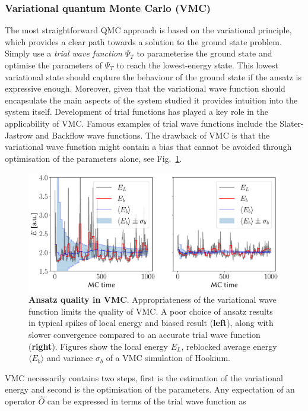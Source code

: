 \subsubsection{Variational quantum Monte Carlo (VMC)}
\label{sec:vmc}
The most straightforward QMC approach is based on the variational principle, which provides a clear path towards a solution to the ground state problem. Simply use a \emph{trial wave function} $\Psi_{T}$ to parameterise the ground state and optimise the parameters of $\Psi_{T}$ to reach the lowest-energy state. This lowest variational state should capture the behaviour of the ground state if the ansatz is expressive enough. Moreover, given that the variational wave function should encapsulate the main aspects of the system studied it provides intuition into the system itself. Development of trial functions has played a key role in the applicability of VMC. Famous examples of trial wave functions include the Slater-Jastrow and Backflow wave functions. The drawback of VMC is that the variational wave function might contain a bias that cannot be avoided through optimisation of the parameters alone, see Fig.~\ref{fig:qmc_blocking}. 
\begin{figure}[h]
	\centering
	\includegraphics[width=\linewidth]{Chapter2/Figs/Vector/blocking}
	\caption[Ansatz quality in VMC]{\textbf{Ansatz quality in VMC}. Appropriateness of the variational wave function limits the quality of VMC. A poor choice of ansatz results in typical spikes of local energy  and biased result (\textbf{left}), along with slower convergence compared to an accurate trial wave function (\textbf{right}). Figures show the local energy $E_L$, reblocked average energy $\langle E_b \rangle$ and variance $\sigma_b$ of a VMC simulation of Hookium.}
	\label{fig:qmc_blocking}
\end{figure}
VMC necessarily contains two steps, first is the estimation of the variational energy and second is the optimisation of the parameters. Any expectation of an operator $\hat{O}$ can be expressed in terms of the trial wave function as
